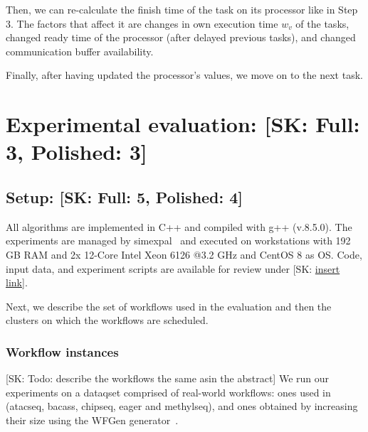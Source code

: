 \documentclass[conference]{IEEEtran}
\newcommand{\skug}[1]{{\color{blue}[SK: #1]}}
\newcommand{\hmey}[1]{{\color{red}[HM: #1]}}
\begin{document}
    Then, we can re-calculate the finish time of the task on its processor like in Step 3.
    The factors that affect it are changes in own execution time $w_v$ of the tasks, changed ready time of the processor
    (after delayed previous tasks), and changed communication buffer availability.

    Finally, after having updated the processor's values, we move on to the next task.





\section{Experimental evaluation: \skug{Full: 3, Polished: 3}}
\label{sec:expe}

\subsection{Setup: \skug{Full: 5, Polished: 4}}
    \label{sec:setup}

    All algorithms are implemented in C++ and compiled with g++ (v.8.5.0).
    The experiments are managed by simexpal~\cite{DBLP:journals/algorithms/AngrimanGLMNPT19} and executed on workstations with 192 GB RAM and 2x 12-Core Intel Xeon 6126 @3.2 GHz
    and CentOS 8 as OS.
    Code, input data, and experiment scripts are available for review under \skug{\url{insert link}}.

    Next, we describe the set of workflows used in the evaluation and then the clusters on which the
    workflows are scheduled.

    \subsubsection{Workflow instances}
    \skug{Todo: describe the workflows the same asin the abstract}
    We run our experiments on a dataqset comprised of real-world workflows: ones used in~\cite{lotaru} (atacseq, bacass, chipseq,
    eager and methylseq), and ones obtained by increasing their size using the WFGen generator~\cite{COLEMAN202216}.
\end{document}
